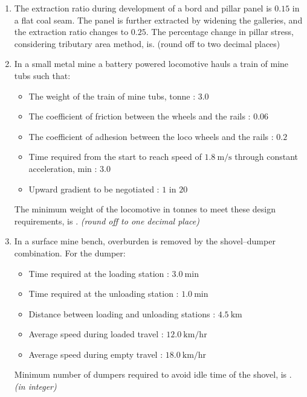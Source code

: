 \documentclass[journal,12pt,onecolumn]{IEEEtran}
\theoremstyle{remark}
\begin{document}
\begin{enumerate}
\hfill{}
\item The extraction ratio during development of a bord and pillar panel is $0.15$ in a flat coal seam. The panel is further extracted by widening the galleries, and the extraction ratio changes to $0.25$. The percentage change in pillar stress, considering tributary area method, is. (round off to two decimal places) 

\hfill{}
\item  In a small metal mine a battery powered locomotive hauls a train of mine tubs 
such that:  

\begin{itemize}
    \item The weight of the train of mine tubs, tonne : $3.0$
    \item The coefficient of friction between the wheels and the rails : $0.06$
    \item The coefficient of adhesion between the loco wheels and the rails : $0.2$
    \item Time required from the start to reach speed of $1.8 \ \text{m/s}$ through constant acceleration, min : $3.0$
    \item Upward gradient to be negotiated : $1 \text{ in } 20$
\end{itemize}

The minimum weight of the locomotive in tonnes to meet these design requirements, is \underline{\hspace{2cm}}.  
\textit{(round off to one decimal place)}

\hfill{}
\item  In a surface mine bench, overburden is removed by the shovel--dumper combination.  
For the dumper:  

\begin{itemize}
    \item Time required at the loading station : $3.0 \ \text{min}$
    \item Time required at the unloading station : $1.0 \ \text{min}$
    \item Distance between loading and unloading stations : $4.5 \ \text{km}$
    \item Average speed during loaded travel : $12.0 \ \text{km/hr}$
    \item Average speed during empty travel : $18.0 \ \text{km/hr}$
\end{itemize}

Minimum number of dumpers required to avoid idle time of the shovel, is \underline{\hspace{1.5cm}}. \\
\textit{(in integer)}
\hfill{}


\end{enumerate}
\end{document}

